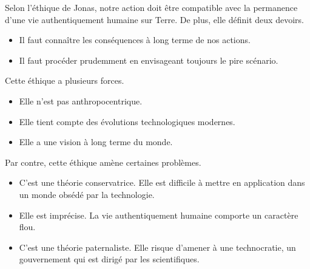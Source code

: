 \documentclass[11pt]{article}
\begin{document}
Selon l'éthique de Jonas, notre action doit être compatible avec la permanence d'une vie authentiquement humaine sur Terre. De plus, elle définit deux devoirs. 
\begin{itemize}  
\item Il faut connaître les conséquences à long terme de nos actions.
\item Il faut procéder prudemment en envisageant toujours le pire scénario.
\end{itemize}

Cette éthique a plusieurs forces.
\begin{itemize}  
\item Elle n'est pas anthropocentrique.
\item Elle tient compte des évolutions technologiques modernes.
\item Elle a une vision à long terme du monde.
\end{itemize}

Par contre, cette éthique amène certaines problèmes.
\begin{itemize}  
\item C'est une théorie conservatrice. Elle est difficile à mettre en application dans un monde obsédé par la technologie.
\item Elle est imprécise. La vie authentiquement humaine comporte un caractère flou.
\item C'est une théorie paternaliste. Elle risque d'amener à une technocratie, un gouvernement qui est dirigé par les scientifiques.
\end{itemize}
\end{document}
